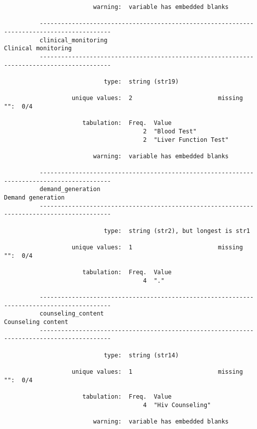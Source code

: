 \documentclass{article}
\begin{document}
\begin{verbatim}
                         warning:  variable has embedded blanks
          
          ------------------------------------------------------------------------------------------
          clinical_monitoring                                                    Clinical monitoring
          ------------------------------------------------------------------------------------------
          
                            type:  string (str19)
          
                   unique values:  2                        missing "":  0/4
          
                      tabulation:  Freq.  Value
                                       2  "Blood Test"
                                       2  "Liver Function Test"
          
                         warning:  variable has embedded blanks
          
          ------------------------------------------------------------------------------------------
          demand_generation                                                        Demand generation
          ------------------------------------------------------------------------------------------
          
                            type:  string (str2), but longest is str1
          
                   unique values:  1                        missing "":  0/4
          
                      tabulation:  Freq.  Value
                                       4  "."
          
          ------------------------------------------------------------------------------------------
          counseling_content                                                      Counseling content
          ------------------------------------------------------------------------------------------
          
                            type:  string (str14)
          
                   unique values:  1                        missing "":  0/4
          
                      tabulation:  Freq.  Value
                                       4  "Hiv Counseling"
          
                         warning:  variable has embedded blanks
          

\end{verbatim}
\end{document}
